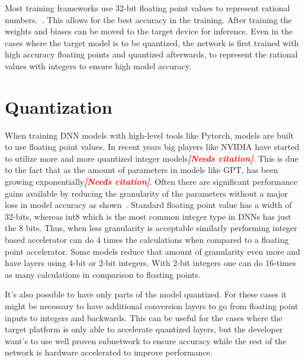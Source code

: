 \documentclass[12pt,a4paper,english
]{tunithesis}
\newcommand{\fixthis}[1]{\textbf{\textit{\textcolor{red}{[#1]}}}}
\begin{document}
Most training frameworks use 32-bit floating point values to represent rational numbers.~\cite{paszke_pytorch_2019}\cite{tensorflow2015-whitepaper}. This allows for the best accuracy in the training. After training the weights and biases can be moved to the target device for inference. Even in the cases where the target model is to be quantized, the network is first trained with high accuracy floating points and quantized afterwards, to represent the rational values with integers to ensure high model accuracy.

\section{Quantization}
When training DNN models with high-level tools like Pytorch, models are built to use floating point values. In recent years big players like NVIDIA have started to utilize more and more quantized integer models\fixthis{Needs citation}. This is due to the fact that as the amount of parameters in models like GPT, has been growing exponentially\fixthis{Needs citation}. Often there are significant performance gains available by reducing the granularity of the parameters without a major loss in model accuracy as shown~\cite{krishnamoorthi_quantizing_2018,draghici_capabilities_2002}. Standard floating point value has a width of 32-bits, whereas int8 which is the most common integer type in DNNs has just the 8 bits. Thus, when less granularity is acceptable similarly performing integer based accelerator can do 4 times the calculations when compared to a floating point accelerator.
Some models reduce that amount of granularity even more and have layers using 4-bit or 2-bit integers. With 2-bit integers one can do 16-times as many calculations in comparison to floating points.

It's also possible to have only parts of the model quantized. For these cases it might be necessary to have additional conversion layers to go from floating point inputs to integers and backwards. This can be useful for the cases where the target platform is only able to accelerate quantized layers, but the developer want's to use well proven subnetwork to ensure accuracy while the rest of the network is hardware accelerated to improve performance.
\end{document}
